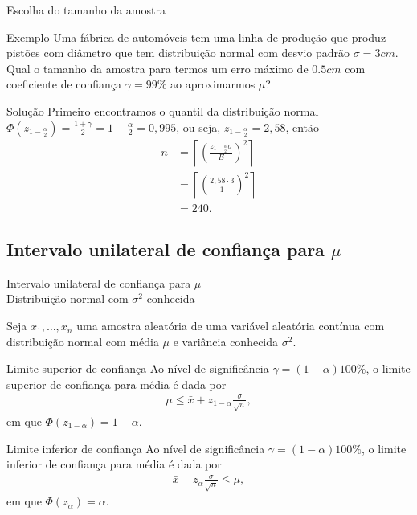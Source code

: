 \documentclass[8pt]{beamer}
\begin{document}
\begin{frame}{Escolha do tamanho da amostra}
	\begin{block}{Exemplo}
		Uma fábrica de automóveis tem uma linha de produção que produz pistões com diâmetro que tem distribuição normal com desvio padrão $\sigma=3 cm$. Qual o tamanho da amostra para termos um erro máximo de $0.5cm$ com coeficiente de confiança $\gamma = 99\%$ ao aproximarmos $\mu$?
	\end{block}
	\vfill
	
	\begin{block}{Solução}
		Primeiro encontramos o quantil da distribuição normal $\Phi(z_{1-\frac{\alpha}{2}}) = \frac{1+\gamma}{2} = 1 - \frac{\alpha}{2} = 0,995$, ou seja,  $z_{1-\frac{\alpha}{2}} = 2,58$, então
		\begin{align*}
		n &= \left\lceil \left( \frac{z_{1-\frac{\alpha}{2}} \sigma}{E} \right)^2 \right\rceil\\
		&= \left\lceil \left( \frac{2,58 \cdot 3}{1} \right)^2 \right\rceil\\
		&= 240.
		\end{align*}
	\end{block}
\end{frame}

\subsection{Intervalo unilateral de confiança para $\mu$}

\begin{frame}{Intervalo unilateral de confiança para $\mu$\\ Distribuição normal com $\sigma^2$ conhecida}

\normalsize

Seja $x_1, \dots, x_n$ uma amostra aleatória de uma variável aleatória contínua com distribuição normal com média $\mu$ e variância conhecida $\sigma^2$. 

	\begin{block}{Limite superior de confiança}
		Ao nível de significância $\gamma=(1-\alpha)100\%$, o limite superior de confiança para média é dada por
		\begin{align*}
			\mu \leq \bar{x} + z_{1-\alpha} \frac{\sigma}{\sqrt{n}},
		\end{align*}
		em que $\Phi\left( z_{1-\alpha} \right) = 1-\alpha$.
		
	\end{block}

	\begin{block}{Limite inferior de confiança}
		Ao nível de significância $\gamma=(1-\alpha)100\%$, o limite inferior de confiança para média é dada por
		\begin{align*}
		\bar{x} + z_\alpha \frac{\sigma}{\sqrt{n}} \leq \mu,
		\end{align*}
		em que $\Phi\left( z_\alpha \right) = \alpha$.
	\end{block}

\end{frame}
\end{document}
